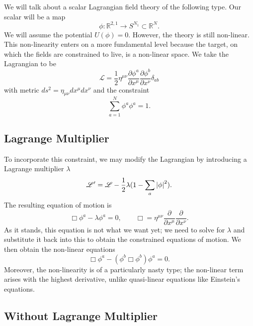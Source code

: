 We will talk about a scalar Lagrangian field theory of the following type.
Our scalar will be a map 
\begin{equation}
  \phi \colon \mathbb{R}^{2, 1} \to S^{N_1} \subset \mathbb{R}^N.
\end{equation}
We will assume the potential $U(\phi) = 0$. However, the theory is still non-linear. This non-linearity enters on a more fundamental level because the target, on which the fields are constrained to live, is a non-linear space.
We take the Lagrangian to be
\begin{equation}
  \mathscr{L} = \frac{1}{2} \eta^{\mu\nu} \frac{\partial \phi^{a}}{\partial x^{\mu}} \frac{\partial \phi^{b}}{\partial x^{\nu}} \delta_{ab}
\end{equation}
with metric $ds^2 = \eta_{\mu\nu} dx^{\mu} dx^{\nu}$ and the constraint
\begin{equation}
  \sum_{a=1}^{N} \phi^{a} \phi^{a} = 1.
\end{equation}

\subsection*{Lagrange Multiplier}%

To incorporate this constraint, we may modify the Lagrangian by introducing a Lagrange multiplier $\lambda$
\begin{equation}
  \mathscr{L}' = \mathscr{L} - \frac{1}{2} \lambda (1 - \sum_{a} \abs{\phi}^2).
\end{equation}
The resulting equation of motion is
\begin{equation}
  \Box \phi^{a} - \lambda \phi^{a} = 0, \qquad \Box = \eta^{\mu\nu} \frac{\partial }{\partial x^{\mu}} \frac{\partial }{\partial x^{\nu}}.
\end{equation}
As it stands, this equation is not what we want yet; we need to solve for $\lambda$ and substitute it back into this to obtain the constrained equations of motion.
We then obtain the non-linear equations
\begin{equation}
  \Box \phi^{a} - (\phi^{b} \Box \phi^{b}) \phi^{a} =0.
\end{equation}
Moreover, the non-linearity is of a particularly nasty type; the non-linear term arises with the highest derivative, unlike quasi-linear equations like Einstein's equations.

\subsection*{Without Lagrange Multiplier}%

